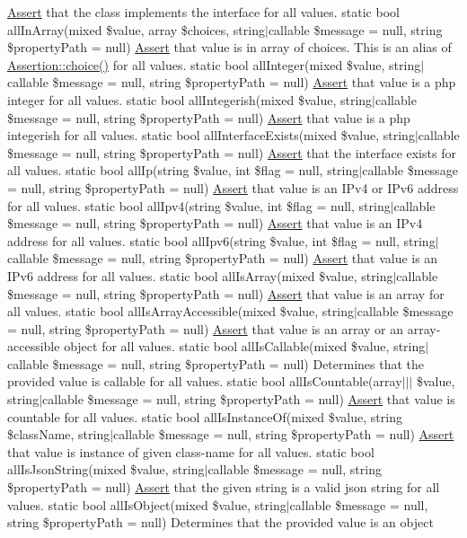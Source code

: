 \mbox{\hyperlink{class_assert_1_1_assert}{Assert}} that the class implements the interface for all values.  static bool all\+In\+Array(mixed \$value, array \$choices, string$\vert$callable \$message = null, string \$property\+Path = null) \mbox{\hyperlink{class_assert_1_1_assert}{Assert}} that value is in array of choices. This is an alias of \mbox{\hyperlink{class_assert_1_1_assertion_a3775923caa193a78aa0bb48a66ee61d0}{Assertion\+::choice()}} for all values.  static bool all\+Integer(mixed \$value, string$\vert$callable \$message = null, string \$property\+Path = null) \mbox{\hyperlink{class_assert_1_1_assert}{Assert}} that value is a php integer for all values.  static bool all\+Integerish(mixed \$value, string$\vert$callable \$message = null, string \$property\+Path = null) \mbox{\hyperlink{class_assert_1_1_assert}{Assert}} that value is a php integer\textquotesingle{}ish for all values.  static bool all\+Interface\+Exists(mixed \$value, string$\vert$callable \$message = null, string \$property\+Path = null) \mbox{\hyperlink{class_assert_1_1_assert}{Assert}} that the interface exists for all values.  static bool all\+Ip(string \$value, int \$flag = null, string$\vert$callable \$message = null, string \$property\+Path = null) \mbox{\hyperlink{class_assert_1_1_assert}{Assert}} that value is an I\+Pv4 or I\+Pv6 address for all values.  static bool all\+Ipv4(string \$value, int \$flag = null, string$\vert$callable \$message = null, string \$property\+Path = null) \mbox{\hyperlink{class_assert_1_1_assert}{Assert}} that value is an I\+Pv4 address for all values.  static bool all\+Ipv6(string \$value, int \$flag = null, string$\vert$callable \$message = null, string \$property\+Path = null) \mbox{\hyperlink{class_assert_1_1_assert}{Assert}} that value is an I\+Pv6 address for all values.  static bool all\+Is\+Array(mixed \$value, string$\vert$callable \$message = null, string \$property\+Path = null) \mbox{\hyperlink{class_assert_1_1_assert}{Assert}} that value is an array for all values.  static bool all\+Is\+Array\+Accessible(mixed \$value, string$\vert$callable \$message = null, string \$property\+Path = null) \mbox{\hyperlink{class_assert_1_1_assert}{Assert}} that value is an array or an array-\/accessible object for all values.  static bool all\+Is\+Callable(mixed \$value, string$\vert$callable \$message = null, string \$property\+Path = null) Determines that the provided value is callable for all values.  static bool all\+Is\+Countable(array$\vert$$\vert$$\vert$ \$value, string$\vert$callable \$message = null, string \$property\+Path = null) \mbox{\hyperlink{class_assert_1_1_assert}{Assert}} that value is countable for all values.  static bool all\+Is\+Instance\+Of(mixed \$value, string \$class\+Name, string$\vert$callable \$message = null, string \$property\+Path = null) \mbox{\hyperlink{class_assert_1_1_assert}{Assert}} that value is instance of given class-\/name for all values.  static bool all\+Is\+Json\+String(mixed \$value, string$\vert$callable \$message = null, string \$property\+Path = null) \mbox{\hyperlink{class_assert_1_1_assert}{Assert}} that the given string is a valid json string for all values.  static bool all\+Is\+Object(mixed \$value, string$\vert$callable \$message = null, string \$property\+Path = null) Determines that the provided value is an object 